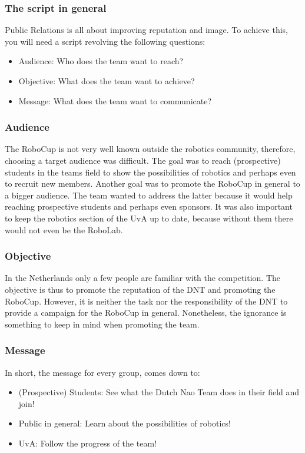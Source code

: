 \documentclass[11pt,a4paper,oneside]{article}
\begin{document}
\subsubsection{The script in general}
Public Relations is all about improving reputation and image. To achieve this, you will need a script revolving the following questions:
\begin{itemize}
\item Audience: Who does the team want to reach?
\item Objective: What does the team want to achieve?
\item Message: What does the team want to communicate?
\end{itemize}

\subsubsection{Audience}
The RoboCup is not very well known outside the robotics community, therefore, choosing a target audience was difficult. The goal was to reach (prospective) students in the teams field to show the possibilities of robotics and perhaps even to recruit new members. Another goal was to promote the RoboCup in general to a bigger audience. The team wanted to address the latter because it would help reaching prospective students and perhaps even sponsors. It was also important to keep the robotics section of the UvA up to date, because without them there would not even be the RoboLab.

\subsubsection{Objective}
In the Netherlands only a few people are familiar with the competition. The objective is thus to promote the reputation of the DNT and promoting the RoboCup. However, it is neither the task nor the responsibility of the DNT to provide a campaign for the RoboCup in general. Nonetheless, the ignorance is something to keep in mind when promoting the team.

\subsubsection{Message}
In short, the message for every group, comes down to:
\begin{itemize}
\item (Prospective) Students: See what the Dutch Nao Team does in their field and join!
\item Public in general: Learn about the possibilities of robotics!
\item UvA: Follow the progress of the team!
\end{itemize}
\end{document}
